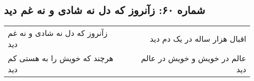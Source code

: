 \begin{center}
\section*{شماره ۶۰: زآنروز که دل نه شادی و نه غم دید}
\label{sec:060}
\begin{longtable}{l p{0.5cm} r}
زآنروز که دل نه شادی و نه غم دید
&&
اقبال هزار ساله در یک دم دید
\\
هرچند که خویش را به هستی کم دید
&&
عالم در خویش و خویش در عالم دید
\\
\end{longtable}
\end{center}
